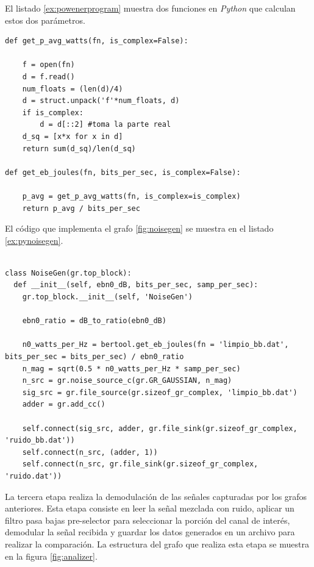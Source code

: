 El listado \ref{ex:powenerprogram} muestra dos funciones en \emph{Python} que calculan estos dos
par\'ametros.

\begin{lstlisting}[float, label=ex:powenerprogram, caption={Funciones en \emph{Python} para calcular la
potencia y la energia promedio de una se\~nal}]
def get_p_avg_watts(fn, is_complex=False):

    f = open(fn)
    d = f.read()
    num_floats = (len(d)/4)
    d = struct.unpack('f'*num_floats, d)
    if is_complex:
        d = d[::2] #toma la parte real
    d_sq = [x*x for x in d]
    return sum(d_sq)/len(d_sq)
    
def get_eb_joules(fn, bits_per_sec, is_complex=False):

    p_avg = get_p_avg_watts(fn, is_complex=is_complex)
    return p_avg / bits_per_sec

\end{lstlisting}

El c\'odigo que implementa el grafo \ref{fig:noisegen} se muestra en el listado \ref{ex:pynoisegen}.

\begin{lstlisting}[float, label=ex:pynoisegen, caption={C\'odigo que implementa el grafo generador
de ruido}, breaklines=true]

class NoiseGen(gr.top_block):
  def __init__(self, ebn0_dB, bits_per_sec, samp_per_sec):
    gr.top_block.__init__(self, 'NoiseGen')

    ebn0_ratio = dB_to_ratio(ebn0_dB)

    n0_watts_per_Hz = bertool.get_eb_joules(fn = 'limpio_bb.dat', bits_per_sec = bits_per_sec) / ebn0_ratio 
    n_mag = sqrt(0.5 * n0_watts_per_Hz * samp_per_sec)
    n_src = gr.noise_source_c(gr.GR_GAUSSIAN, n_mag)
    sig_src = gr.file_source(gr.sizeof_gr_complex, 'limpio_bb.dat')
    adder = gr.add_cc()

    self.connect(sig_src, adder, gr.file_sink(gr.sizeof_gr_complex, 'ruido_bb.dat'))
    self.connect(n_src, (adder, 1))
    self.connect(n_src, gr.file_sink(gr.sizeof_gr_complex, 'ruido.dat'))
\end{lstlisting}

La tercera etapa realiza la demodulaci\'on de las se\~nales capturadas por los grafos anteriores.
Esta etapa consiste en leer la se\~nal mezclada con ruido, aplicar un filtro pasa bajas pre-selector
para seleccionar la porci\'on del canal de inter\'es, demodular la se\~nal recibida y guardar los
datos generados en un archivo para realizar la comparaci\'on. La estructura del grafo que realiza esta
etapa se muestra en la figura \ref{fig:analizer}.

